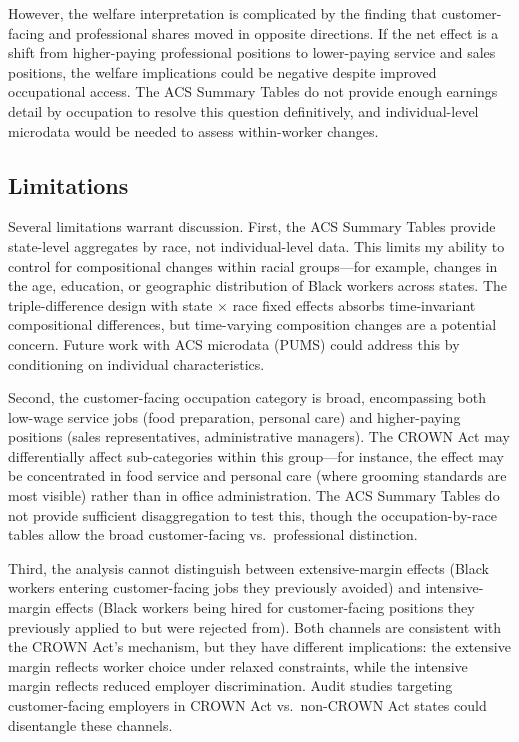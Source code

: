 \documentclass[12pt]{article}
\begin{document}
However, the welfare interpretation is complicated by the finding that customer-facing and professional shares moved in opposite directions. If the net effect is a shift from higher-paying professional positions to lower-paying service and sales positions, the welfare implications could be negative despite improved occupational access. The ACS Summary Tables do not provide enough earnings detail by occupation to resolve this question definitively, and individual-level microdata would be needed to assess within-worker changes.

\subsection{Limitations}

Several limitations warrant discussion. First, the ACS Summary Tables provide state-level aggregates by race, not individual-level data. This limits my ability to control for compositional changes within racial groups---for example, changes in the age, education, or geographic distribution of Black workers across states. The triple-difference design with state $\times$ race fixed effects absorbs time-invariant compositional differences, but time-varying composition changes are a potential concern. Future work with ACS microdata (PUMS) could address this by conditioning on individual characteristics.

Second, the customer-facing occupation category is broad, encompassing both low-wage service jobs (food preparation, personal care) and higher-paying positions (sales representatives, administrative managers). The CROWN Act may differentially affect sub-categories within this group---for instance, the effect may be concentrated in food service and personal care (where grooming standards are most visible) rather than in office administration. The ACS Summary Tables do not provide sufficient disaggregation to test this, though the occupation-by-race tables allow the broad customer-facing vs.\ professional distinction.

Third, the analysis cannot distinguish between extensive-margin effects (Black workers entering customer-facing jobs they previously avoided) and intensive-margin effects (Black workers being hired for customer-facing positions they previously applied to but were rejected from). Both channels are consistent with the CROWN Act's mechanism, but they have different implications: the extensive margin reflects worker choice under relaxed constraints, while the intensive margin reflects reduced employer discrimination. Audit studies targeting customer-facing employers in CROWN Act vs.\ non-CROWN Act states could disentangle these channels.
\end{document}

